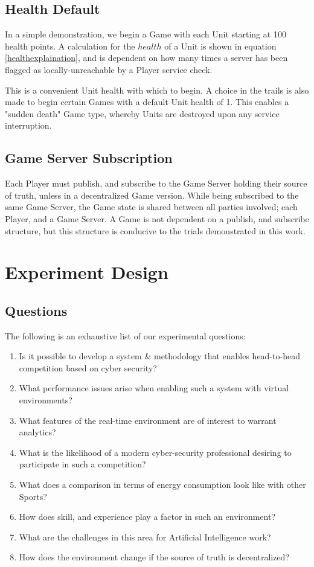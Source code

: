 \documentclass[10pt, titlepage, twocolumn]{article}
\newcommand{\ii}{\indent\indent}
\begin{document}
\subsection{Health Default}
\ii
In a simple demonstration, we begin a Game with each Unit starting at 100 health points. A calculation for the \(health\) of a Unit is shown in equation \ref{healthexplaination}, and is dependent on how many times a server has been flagged as locally-unreachable by a Player service check. 

This is a convenient Unit health with which to begin. A choice in the trails is also made to begin certain Games with a default Unit health of 1. This enables a "sudden death" Game type, whereby Units are destroyed upon any service interruption. 

\subsection{Game Server Subscription}
\ii
Each Player must publish, and subscribe to the Game Server holding their source of truth, unless in a decentralized Game version. While being subscribed to the same Game Server, the Game state is shared between all parties involved; each Player, and a Game Server. A Game is not dependent on a publish, and subscribe structure, but this structure is conducive to the trials demonstrated in this work.







\section{Experiment Design}


\subsection{Questions}
The following is an exhaustive list of our experimental questions:


\begin{enumerate}
	\item Is it possible to develop a system \& methodology that enables head-to-head competition based on cyber security?
	\item What performance issues arise when enabling such a system with virtual environments?
	\item What features of the real-time environment are of interest to warrant analytics?
	\item What is the likelihood of a modern cyber-security professional desiring to participate in such a competition?
	\item What does a comparison in terms of energy consumption look like with other Sports?
	\item How does skill, and experience play a factor in such an environment?
	\item What are the challenges in this area for Artificial Intelligence work?
	\item How does the environment change if the source of truth is decentralized?
\end{enumerate}
\end{document}
